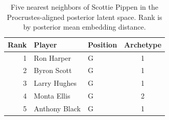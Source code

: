 \begin{table}[htbp]
  \centering\small
  \begin{tabular}{rllc}
    \toprule
    Rank & Player & Position & Archetype \\
    \midrule
    1 & Ron Harper & G & 1 \\
    2 & Byron Scott & G & 1 \\
    3 & Larry Hughes & G & 1 \\
    4 & Monta Ellis & G & 2 \\
    5 & Anthony Black & G & 1 \\
    \bottomrule
  \end{tabular}
  \caption{Five nearest neighbors of Scottie Pippen in the Procrustes-aligned posterior latent space. Rank is by posterior mean embedding distance.}
  \label{tab:Scottie_Pippen_neighbors}
\end{table}

